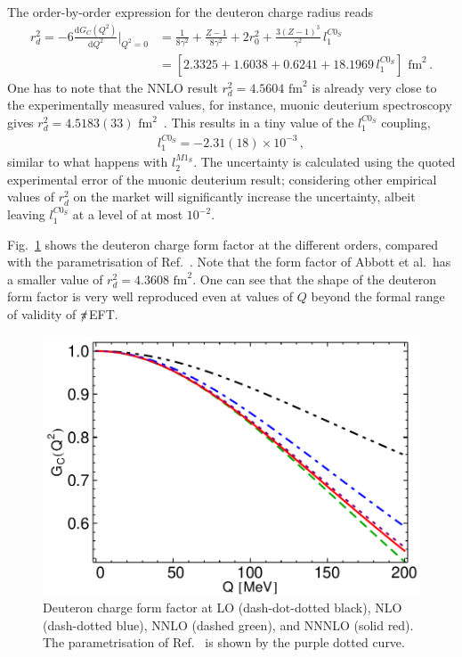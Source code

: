 \documentclass[prl,
twocolumn,
showpacs,preprintnumbers,amsmath,amssymb,
superscriptaddress,
a4paper,nofootinbib,longbibliography]{revtex4-2}
\def\piEFT/{$\slashed{\pi}$EFT}
\begin{document}
The order-by-order expression for the deuteron charge radius reads
\begin{align}
    r_d^2 = -6\frac{\mathrm{d}G_C(Q^2)}{\mathrm{d}Q^2}\bigg|_{Q^2=0} & =
    \frac{1}{8 \gamma ^2}
    +\frac{Z-1}{8 \gamma ^2}
    +2r_0^2
    +\frac{3(Z-1)^3}{\gamma ^2}\,l_1^{C0_S}\nonumber \\
    & = \left[2.3325+1.6038+0.6241+18.1969\, l_1^{C0_S} \right]\text{ fm}^2\,.
\end{align}
One has to note that the NNLO result $r_d^2=4.5604\text{ fm}^2$ is already very close to the experimentally measured values, for instance, muonic deuterium spectroscopy gives $r_d^2=4.5183(33)\text{ fm}^2$~\cite{Pohl669}. This results in a tiny value of the $l_1^{C0_S}$ coupling,
\begin{align}
    l_1^{C0_S}=-2.31(18)\times 10^{-3}\,,
\end{align}
similar to what happens with $l_2^{M1_S}$. The uncertainty is calculated using the quoted experimental error of the muonic deuterium result; considering other empirical values of $r_d^2$ on the market will significantly increase the uncertainty, albeit leaving $l_1^{C0_S}$ at a level of at most $10^{-2}$.

Fig.~\ref{fig:GC} shows the deuteron charge form factor at the different orders, compared with the parametrisation of Ref.~\cite{Abbott:2000ak}. Note that the form factor of Abbott et al.\ has a smaller value of $r_d^2=4.3608\text{ fm}^2$. One can see that the shape of the deuteron form factor is very well reproduced even at values of $Q$ beyond the formal range of validity of \piEFT/. 
\begin{figure}[htb]
    \centering
    \includegraphics[width=0.6\columnwidth]{figs/GC.pdf}
    \caption{Deuteron charge form factor at LO (dash-dot-dotted black), NLO (dash-dotted blue), NNLO (dashed green), and NNNLO (solid red). The parametrisation of Ref.~\cite{Abbott:2000ak} is shown by the purple dotted curve.}
    \label{fig:GC}
\end{figure}
\end{document}
